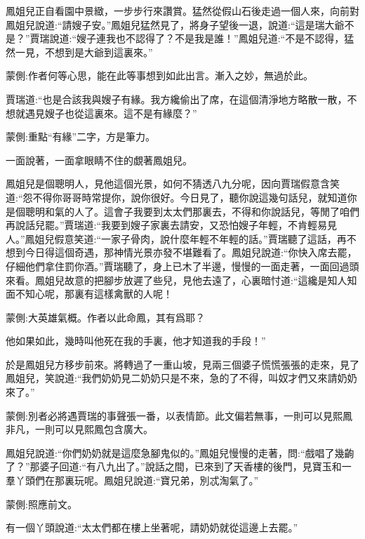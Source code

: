 \begin{parag}
    鳳姐兒正自看園中景緻，一步步行來讚賞。猛然從假山石後走過一個人來，向前對鳳姐兒說道:“請嫂子安。”鳳姐兒猛然見了，將身子望後一退，說道:“這是瑞大爺不是？”賈瑞說道:“嫂子連我也不認得了？不是我是誰！”鳳姐兒道:“不是不認得，猛然一見，不想到是大爺到這裏來。”\begin{note}蒙側:作者何等心思，能在此等事想到如此出言。漸入之妙，無過於此。\end{note}賈瑞道:“也是合該我與嫂子有緣。我方纔偷出了席，在這個清淨地方略散一散，不想就遇見嫂子也從這裏來。這不是有緣麼？”\begin{note}蒙側:重點“有緣”二字，方是筆力。\end{note}一面說著，一面拿眼睛不住的覷著鳳姐兒。
\end{parag}


\begin{parag}
    鳳姐兒是個聰明人，見他這個光景，如何不猜透八九分呢，因向賈瑞假意含笑道:“怨不得你哥哥時常提你，說你很好。今日見了，聽你說這幾句話兒，就知道你是個聰明和氣的人了。這會子我要到太太們那裏去，不得和你說話兒，等閒了咱們再說話兒罷。”賈瑞道:“我要到嫂子家裏去請安，又恐怕嫂子年輕，不肯輕易見人。”鳳姐兒假意笑道:“一家子骨肉，說什麼年輕不年輕的話。”賈瑞聽了這話，再不想到今日得這個奇遇，那神情光景亦發不堪難看了。鳳姐兒說道:“你快入席去罷，仔細他們拿住罰你酒。”賈瑞聽了，身上已木了半邊，慢慢的一面走著，一面回過頭來看。鳳姐兒故意的把腳步放遲了些兒，見他去遠了，心裏暗忖道:“這纔是知人知面不知心呢，那裏有這樣禽獸的人呢！\begin{note}蒙側:大英雄氣概。作者以此命鳳，其有爲耶？\end{note}他如果如此，幾時叫他死在我的手裏，他才知道我的手段！”
\end{parag}


\begin{parag}
    於是鳳姐兒方移步前來。將轉過了一重山坡，見兩三個婆子慌慌張張的走來，見了鳳姐兒，笑說道:“我們奶奶見二奶奶只是不來，急的了不得，叫奴才們又來請奶奶來了。”\begin{note}蒙側:別者必將遇賈瑞的事聲張一番，以表情節。此文偏若無事，一則可以見熙鳳非凡，一則可以見熙鳳包含廣大。\end{note}鳳姐兒說道:“你們奶奶就是這麼急腳鬼似的。”鳳姐兒慢慢的走著，問:“戲唱了幾齣了？”那婆子回道:“有八九出了。”說話之間，已來到了天香樓的後門，見寶玉和一羣丫頭們在那裏玩呢。鳳姐兒說道:“寶兄弟，別忒淘氣了。”\begin{note}蒙側:照應前文。\end{note}有一個丫頭說道:“太太們都在樓上坐著呢，請奶奶就從這邊上去罷。”
\end{parag}


